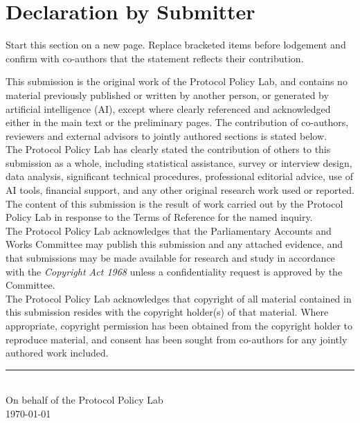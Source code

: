 
\section{Declaration by Submitter}

\begin{instructional}
Start this section on a new page. Replace bracketed items before lodgement and confirm with co-authors that the statement reflects their contribution.
\end{instructional}

\noindent
This submission is the original work of the Protocol Policy Lab, and contains no material previously published or written by another person, or generated by artificial intelligence (AI), except where clearly referenced and acknowledged either in the main text or the preliminary pages. The contribution of co-authors, reviewers and external advisors to jointly authored sections is stated below.\\

\noindent
The Protocol Policy Lab has clearly stated the contribution of others to this submission as a whole, including statistical assistance, survey or interview design, data analysis, significant technical procedures, professional editorial advice, use of AI tools, financial support, and any other original research work used or reported. The content of this submission is the result of work carried out by the Protocol Policy Lab in response to the Terms of Reference for the named inquiry.\\

\noindent
The Protocol Policy Lab acknowledges that the Parliamentary Accounts and Works Committee may publish this submission and any attached evidence, and that submissions may be made available for research and study in accordance with the \textit{Copyright Act 1968} unless a confidentiality request is approved by the Committee.\\

\noindent
The Protocol Policy Lab acknowledges that copyright of all material contained in this submission resides with the copyright holder(s) of that material. Where appropriate, copyright permission has been obtained from the copyright holder to reproduce material, and consent has been sought from co-authors for any jointly authored work included.\\

\vspace{2em}
\noindent\rule{6cm}{0.4pt}\\
On behalf of the Protocol Policy Lab\\
\today
